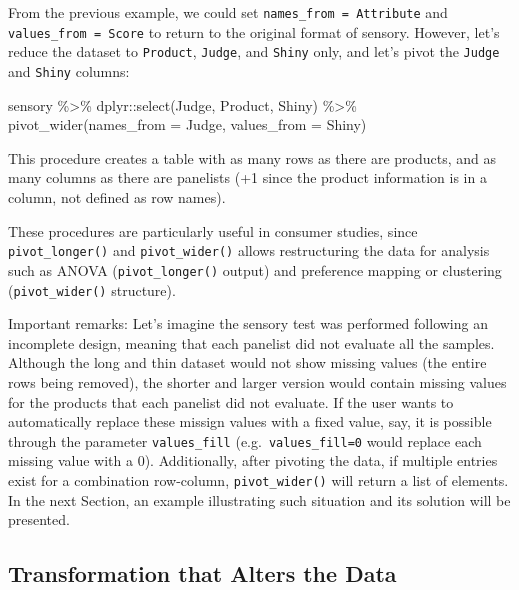 \documentclass[
]{book}
\newenvironment{Shaded}{\begin{snugshade}}{\end{snugshade}}
\newcommand{\AttributeTok}[1]{\textcolor[rgb]{0.77,0.63,0.00}{#1}}
\newcommand{\FunctionTok}[1]{\textcolor[rgb]{0.00,0.00,0.00}{#1}}
\newcommand{\NormalTok}[1]{#1}
\newcommand{\SpecialCharTok}[1]{\textcolor[rgb]{0.00,0.00,0.00}{#1}}
\begin{document}
From the previous example, we could set \texttt{names\_from\ =\ Attribute} and \texttt{values\_from\ =\ Score} to return to the original format of sensory. However, let's reduce the dataset to \texttt{Product}, \texttt{Judge}, and \texttt{Shiny} only, and let's pivot the \texttt{Judge} and \texttt{Shiny} columns:

\begin{Shaded}
\begin{Highlighting}[]
\NormalTok{sensory }\SpecialCharTok{\%\textgreater{}\%} 
\NormalTok{  dplyr}\SpecialCharTok{::}\FunctionTok{select}\NormalTok{(Judge, Product, Shiny) }\SpecialCharTok{\%\textgreater{}\%} 
  \FunctionTok{pivot\_wider}\NormalTok{(}\AttributeTok{names\_from =}\NormalTok{ Judge, }\AttributeTok{values\_from =}\NormalTok{ Shiny)}
\end{Highlighting}
\end{Shaded}

This procedure creates a table with as many rows as there are products, and as many columns as there are panelists (+1 since the product information is in a column, not defined as row names).

These procedures are particularly useful in consumer studies, since \texttt{pivot\_longer()} and \texttt{pivot\_wider()} allows restructuring the data for analysis such as ANOVA (\texttt{pivot\_longer()} output) and preference mapping or clustering (\texttt{pivot\_wider()} structure).

Important remarks: Let's imagine the sensory test was performed following an incomplete design, meaning that each panelist did not evaluate all the samples. Although the long and thin dataset would not show missing values (the entire rows being removed), the shorter and larger version would contain missing values for the products that each panelist did not evaluate. If the user wants to automatically replace these missign values with a fixed value, say, it is possible through the parameter \texttt{values\_fill} (e.g.~\texttt{values\_fill=0} would replace each missing value with a 0). Additionally, after pivoting the data, if multiple entries exist for a combination row-column, \texttt{pivot\_wider()} will return a list of elements. In the next Section, an example illustrating such situation and its solution will be presented.

\hypertarget{transformation-that-alters-the-data}{%
\subsection{Transformation that Alters the Data}\label{transformation-that-alters-the-data}}
\end{document}
